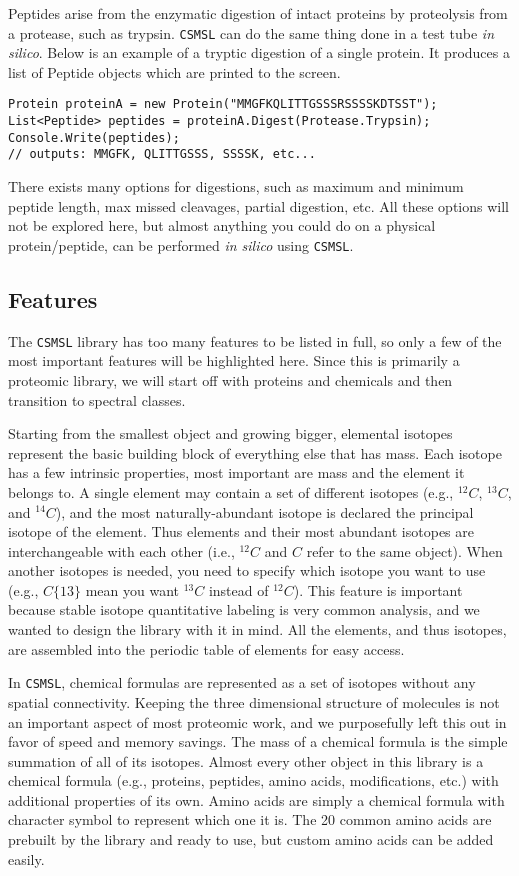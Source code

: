 Peptides arise from the enzymatic digestion of intact proteins by proteolysis from a protease, such as trypsin. \texttt{CSMSL} can do the same thing done in a test tube \emph{in silico}. Below is an example of a tryptic digestion of a single protein. It produces a list of Peptide objects which are printed to the screen.

\begin{lstlisting}
Protein proteinA = new Protein("MMGFKQLITTGSSSRSSSSKDTSST");
List<Peptide> peptides = proteinA.Digest(Protease.Trypsin);
Console.Write(peptides);
// outputs: MMGFK, QLITTGSSS, SSSSK, etc...
\end{lstlisting}

There exists many options for digestions, such as maximum and minimum peptide length, max missed cleavages, partial digestion, etc. All these options will not be explored here, but almost anything you could do on a physical protein/peptide, can be performed \emph{in silico} using \texttt{CSMSL}.

\subsection*{Features}
The \texttt{CSMSL} library has too many features to be listed in full, so only a few of the most important features will be highlighted here. Since this is primarily a proteomic library, we will start off with proteins and chemicals and then transition to spectral classes. 

Starting from the smallest object and growing bigger, elemental isotopes represent the basic building block of everything else that has mass. Each isotope has a few intrinsic properties, most important are mass and the element it belongs to. A single element may contain a set of different isotopes (e.g., $^{12}C$, $^{13}C$, and $^{14}C$), and the most naturally-abundant isotope is declared the principal isotope of the element. Thus elements and their most abundant isotopes are interchangeable with each other (i.e., $^{12}C$ and $C$ refer to the same object). When another isotopes is needed, you need to specify which isotope you want to use (e.g., $C\{13\}$ mean you want $^{13}C$ instead of $^{12}C$). This feature is important because stable isotope quantitative labeling is very common analysis, and we wanted to design the library with it in mind. All the elements, and thus isotopes, are assembled into the periodic table of elements for easy access.

In \texttt{CSMSL}, chemical formulas are represented as a set of isotopes without any spatial connectivity. Keeping the three dimensional structure of molecules is not an important aspect of most proteomic work, and we purposefully left this out in favor of speed and memory savings. The mass of a chemical formula is the simple summation of all of its isotopes. Almost every other object in this library is a chemical formula (e.g., proteins, peptides, amino acids, modifications, etc.)  with additional properties of its own. Amino acids are simply a chemical formula with character symbol to represent which one it is. The 20 common amino acids are prebuilt by the library and ready to use, but custom amino acids can be added easily.

